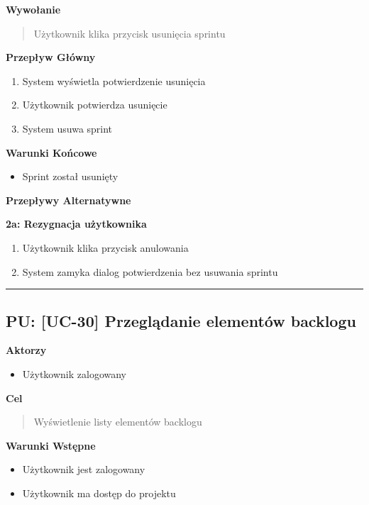 \vspace{0.2cm}
\noindent\textbf{Wywołanie}
\begin{quote}
    Użytkownik klika przycisk usunięcia sprintu
\end{quote}

\vspace{0.2cm}
\noindent\textbf{Przepływ Główny}
\begin{enumerate}
    \item System wyświetla potwierdzenie usunięcia
    \item Użytkownik potwierdza usunięcie
    \item System usuwa sprint
\end{enumerate}

\vspace{0.2cm}
\noindent\textbf{Warunki Końcowe}
\begin{itemize}
    \item Sprint został usunięty
\end{itemize}

\vspace{0.2cm}
\noindent\textbf{Przepływy Alternatywne}

\textbf{2a: Rezygnacja użytkownika}
\begin{enumerate}
    \item Użytkownik klika przycisk anulowania
    \item System zamyka dialog potwierdzenia bez usuwania sprintu
\end{enumerate}


\hrule
\vspace{1cm}

\subsection*{PU: [UC-30] Przeglądanie elementów backlogu}

\noindent\textbf{Aktorzy}
\begin{itemize}
    \item Użytkownik zalogowany
\end{itemize}

\vspace{0.2cm}
\noindent\textbf{Cel}
\begin{quote}
    Wyświetlenie listy elementów backlogu
\end{quote}

\vspace{0.2cm}
\noindent\textbf{Warunki Wstępne}
\begin{itemize}
    \item Użytkownik jest zalogowany
    \item Użytkownik ma dostęp do projektu
\end{itemize}

